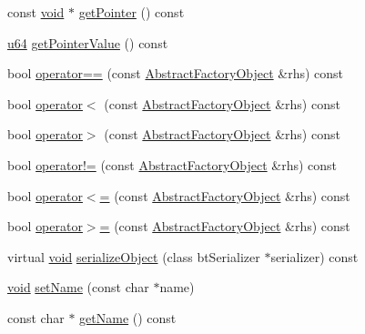 \begin{DoxyCompactItemize}
\item 
const \mbox{\hyperlink{_thread_8h_af1e856da2e658414cb2456cb6f7ebc66}{void}} $\ast$ \mbox{\hyperlink{classnjli_1_1_abstract_factory_object_ac4ca71716ed832be357f15f8262c8448}{get\+Pointer}} () const
\item 
\mbox{\hyperlink{_util_8h_ad758b7a5c3f18ed79d2fcd23d9f16357}{u64}} \mbox{\hyperlink{classnjli_1_1_abstract_factory_object_a4ffddf141a426a5a07d0ac19f1913811}{get\+Pointer\+Value}} () const
\item 
bool \mbox{\hyperlink{classnjli_1_1_abstract_factory_object_ae620e2d5fd6bacf75d6dc63a1a499856}{operator==}} (const \mbox{\hyperlink{classnjli_1_1_abstract_factory_object}{Abstract\+Factory\+Object}} \&rhs) const
\item 
bool \mbox{\hyperlink{classnjli_1_1_abstract_factory_object_af62456deb9b3cd80eeb894b7ee033f44}{operator$<$}} (const \mbox{\hyperlink{classnjli_1_1_abstract_factory_object}{Abstract\+Factory\+Object}} \&rhs) const
\item 
bool \mbox{\hyperlink{classnjli_1_1_abstract_factory_object_aebb630b30d4649b79a5655471cf727a9}{operator$>$}} (const \mbox{\hyperlink{classnjli_1_1_abstract_factory_object}{Abstract\+Factory\+Object}} \&rhs) const
\item 
bool \mbox{\hyperlink{classnjli_1_1_abstract_factory_object_a475bffe85257bce9d5ad5ea4a991fdf9}{operator!=}} (const \mbox{\hyperlink{classnjli_1_1_abstract_factory_object}{Abstract\+Factory\+Object}} \&rhs) const
\item 
bool \mbox{\hyperlink{classnjli_1_1_abstract_factory_object_a2703a2ef27de3bd21b0905c571235922}{operator$<$=}} (const \mbox{\hyperlink{classnjli_1_1_abstract_factory_object}{Abstract\+Factory\+Object}} \&rhs) const
\item 
bool \mbox{\hyperlink{classnjli_1_1_abstract_factory_object_a8ce0719b53e2cca86046b6dbd31aa6af}{operator$>$=}} (const \mbox{\hyperlink{classnjli_1_1_abstract_factory_object}{Abstract\+Factory\+Object}} \&rhs) const
\item 
virtual \mbox{\hyperlink{_thread_8h_af1e856da2e658414cb2456cb6f7ebc66}{void}} \mbox{\hyperlink{classnjli_1_1_abstract_factory_object_a4fc4bcd9d1930911474210c047372fc0}{serialize\+Object}} (class bt\+Serializer $\ast$serializer) const
\item 
\mbox{\hyperlink{_thread_8h_af1e856da2e658414cb2456cb6f7ebc66}{void}} \mbox{\hyperlink{classnjli_1_1_abstract_factory_object_a087eb5f8d9f51cc476f12f1d10a3cb95}{set\+Name}} (const char $\ast$name)
\item 
const char $\ast$ \mbox{\hyperlink{classnjli_1_1_abstract_factory_object_ad41266885be835f3ee602311e20877a4}{get\+Name}} () const
\end{DoxyCompactItemize}
